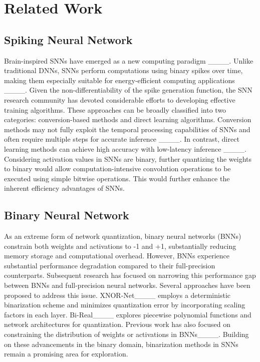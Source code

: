 \section{Related Work}
\subsection{Spiking Neural Network}

Brain-inspired SNNs have emerged as a new computing paradigm ____. Unlike traditional DNNs, SNNs perform computations using binary spikes over time, making them especially suitable for energy-efficient computing applications ____.
Given the non-differentiability of the spike generation function, the SNN research community has devoted considerable efforts to developing effective training algorithms. These approaches can be broadly classified into two categories: conversion-based methods and direct learning algorithms.
Conversion methods may not fully exploit the temporal processing capabilities of SNNs and often require multiple steps for accurate inference ____. In contrast, direct learning methods can achieve high accuracy with low-latency inference ____. 
Considering activation values in SNNs are binary, further quantizing the weights to binary would allow computation-intensive convolution operations to be executed using simple bitwise operations. This would further enhance the inherent efficiency advantages of SNNs.



\subsection{Binary Neural Network}
As an extreme form of network quantization, binary neural networks (BNNs) constrain both weights and activations to -1 and +1, substantially reducing memory storage and computational overhead. However, BNNs experience substantial performance degradation compared to their full-precision counterparts. Subsequent research has focused on narrowing this performance gap between BNNs and full-precision neural networks. Several approaches have been proposed to address this issue.
XNOR-Net____ employs a deterministic binarization scheme and minimizes quantization error by incorporating scaling factors in each layer.
Bi-Real____ explores piecewise polynomial functions and network architectures for quantization. Previous work has also focused on constraining the distribution of weights or activations in BNNs____. 
Building on these advancements in the binary domain, binarization methods in SNNs remain a promising area for exploration.




